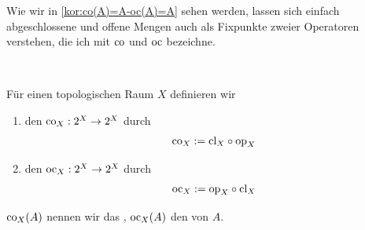     Wie
    wir in \ref{kor:co(A)=A-oc(A)=A} sehen werden, lassen sich einfach abgeschlossene und offene Mengen auch als Fixpunkte zweier Operatoren verstehen, die ich mit $\text{co}$ und $\text{oc}$ bezeichne.
    \begin{dfn}\label{def:cooc} \ \vspace{8pt}

        \noindent
        Für einen topologischen Raum $X$ definieren wir
        \begin{enumerate}
            \item den  $\text{co}_X: 2^X \rightarrow 2^X$ durch
                \begin{align*}
                    \text{co}_X := \text{cl}_X \circ \text{op}_X 		
                \end{align*} 
            \item den  $\text{oc}_X: 2^X \rightarrow 2^X$ durch
                \begin{align*}
                    \text{oc}_X := \text{op}_X \circ \text{cl}_X 		
                \end{align*} 	
        \end{enumerate}	 

        \noindent
        $\text{co}_X(A)$ nennen wir das , $\text{oc}_X(A)$ den  von $A$.
        
    \end{dfn}


